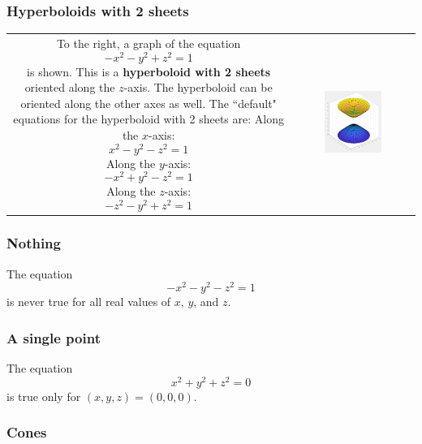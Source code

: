 \documentclass{article}
\begin{document}
\subsubsection*{Hyperboloids with 2 sheets} 

\begin{tabular}{cc}
\parbox{0.5\textwidth}{
To the right, a graph of the equation 
\[-x^2 - y^2 + z^2 = 1\]
is shown. This is a {\bf hyperboloid with 2 sheets} oriented along the \(z\)-axis. The hyperboloid can be oriented along the other axes as well. The ``default" equations for the hyperboloid with 2 sheets are: \\
Along the \(x\)-axis:
\[x^2 - y^2 - z^2 = 1\]
Along the \(y\)-axis:
\[-x^2 + y^2 - z^2 = 1\]
Along the \(z\)-axis:
\[-z^2 - y^2 + z^2 = 1\]
} & \parbox{0.5\textwidth}{
\includegraphics[width = 0.5\textwidth]{2_sheet_hyperboloid.png}
}
\end{tabular}




\subsubsection*{Nothing}

The equation 
\[-x^2 - y^2 - z^2 = 1\]
is never true for all real values of \(x\), \(y\), and \(z\).


\subsubsection*{A single point}

The equation 
\[x^2 + y^2 + z^2 = 0\]
is true only for \((x, y, z) = (0, 0, 0)\).



\subsubsection*{Cones}
\end{document}
